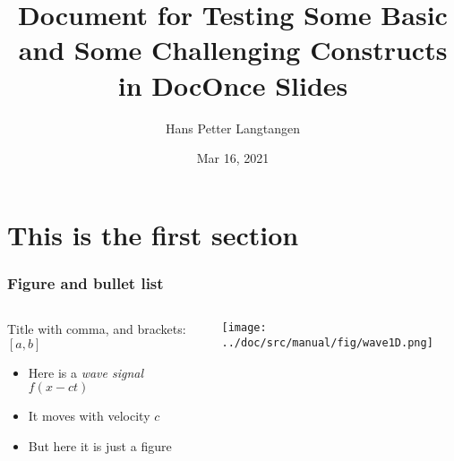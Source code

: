 \documentclass{beamer}
\begin{document}

\newcommand{\exercisesection}[1]{\subsection*{#1}}









\title{Document for Testing Some Basic and Some Challenging Constructs in DocOnce Slides}


\author{Hans Petter Langtangen}

\date{Mar 16, 2021
}

\begin{frame}
\titlepage
\end{frame}

\section[First]{This is the first section}

\begin{frame}
\frametitle{Figure and bullet list}

\begin{columns}
\pause
\begin{block}{Title with comma, and brackets: $[a,b]$ }
\footnotesize

\begin{itemize}
  \item Here is a \emph{wave signal} $f(x-ct)$

  \item It moves with velocity $c$

  \item But here it is just a figure
\end{itemize}

\noindent
\end{block}

\begin{block}{}

\vspace{6mm}

\centerline{\texttt{[image: ../doc/src/manual/fig/wave1D.png]}}

\vspace{6mm}

\end{block}

\end{columns}
\end{frame}
\end{document}
